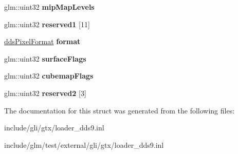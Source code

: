 \begin{DoxyCompactItemize}
\item 
\hypertarget{structgli_1_1gtx_1_1loader__dds9_1_1detail_1_1ddsHeader_a8d7ea11699aa8a1e3ddf8843af88fe1b}{glm\-::uint32 {\bfseries mip\-Map\-Levels}}\label{structgli_1_1gtx_1_1loader__dds9_1_1detail_1_1ddsHeader_a8d7ea11699aa8a1e3ddf8843af88fe1b}

\item 
\hypertarget{structgli_1_1gtx_1_1loader__dds9_1_1detail_1_1ddsHeader_a80e4c81acf7c411a16764f89dd4e48aa}{glm\-::uint32 {\bfseries reserved1} \mbox{[}11\mbox{]}}\label{structgli_1_1gtx_1_1loader__dds9_1_1detail_1_1ddsHeader_a80e4c81acf7c411a16764f89dd4e48aa}

\item 
\hypertarget{structgli_1_1gtx_1_1loader__dds9_1_1detail_1_1ddsHeader_aafce81030113c7b417ee3727f16a0fb0}{\hyperlink{structgli_1_1gtx_1_1loader__dds9_1_1detail_1_1ddsPixelFormat}{dds\-Pixel\-Format} {\bfseries format}}\label{structgli_1_1gtx_1_1loader__dds9_1_1detail_1_1ddsHeader_aafce81030113c7b417ee3727f16a0fb0}

\item 
\hypertarget{structgli_1_1gtx_1_1loader__dds9_1_1detail_1_1ddsHeader_a2f2290b869a775d0718a6994bbd82fa3}{glm\-::uint32 {\bfseries surface\-Flags}}\label{structgli_1_1gtx_1_1loader__dds9_1_1detail_1_1ddsHeader_a2f2290b869a775d0718a6994bbd82fa3}

\item 
\hypertarget{structgli_1_1gtx_1_1loader__dds9_1_1detail_1_1ddsHeader_acf7fb4a18f560080354431edd4f2d1d5}{glm\-::uint32 {\bfseries cubemap\-Flags}}\label{structgli_1_1gtx_1_1loader__dds9_1_1detail_1_1ddsHeader_acf7fb4a18f560080354431edd4f2d1d5}

\item 
\hypertarget{structgli_1_1gtx_1_1loader__dds9_1_1detail_1_1ddsHeader_ac6da6fe2a1acc603b6b3355827a4b532}{glm\-::uint32 {\bfseries reserved2} \mbox{[}3\mbox{]}}\label{structgli_1_1gtx_1_1loader__dds9_1_1detail_1_1ddsHeader_ac6da6fe2a1acc603b6b3355827a4b532}

\end{DoxyCompactItemize}


\-The documentation for this struct was generated from the following files\-:\begin{DoxyCompactItemize}
\item 
include/gli/gtx/loader\-\_\-dds9.\-inl\item 
include/glm/test/external/gli/gtx/loader\-\_\-dds9.\-inl\end{DoxyCompactItemize}
